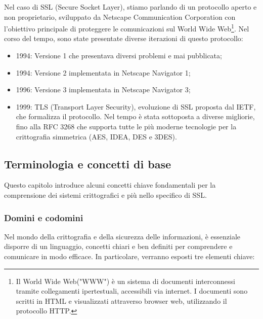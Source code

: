 \documentclass{article}
\theoremstyle{definition}
\begin{document}
Nel caso di SSL (Secure Socket Layer), stiamo parlando di un protocollo aperto e non proprietario, sviluppato da Netscape Communication Corporation con l'obiettivo principale di proteggere le comunicazioni sul World Wide Web\footnote{Il World Wide Web("WWW") è un sistema di documenti interconnessi tramite collegamenti ipertestuali, accessibili via internet. I documenti sono scritti in HTML e visualizzati attraverso browser web, utilizzando il protocollo HTTP.}. Nel corso del tempo, sono state presentate diverse iterazioni di questo protocollo:

\begin{itemize}[label={\textbullet}]
  \item 1994: Versione 1 che presentava diversi problemi e mai pubblicata;
  \item 1994: Versione 2 implementata in Netscape Navigator 1;
  \item 1996: Versione 3 implementata in Netscape Navigator 3;
  \item 1999: TLS (Transport Layer Security), evoluzione di SSL proposta dal IETF, che formalizza il protocollo. Nel tempo è stata sottoposta a diverse migliorie, fino alla RFC 3268 che supporta tutte le più moderne tecnologie per la crittografia simmetrica (AES, IDEA, DES e 3DES).
\end{itemize}

\subsection{Terminologia e concetti di base} %
Questo capitolo introduce alcuni concetti chiave fondamentali per la comprensione dei sistemi crittografici e più nello specifico di SSL.
\subsubsection{Domini e codomini}
Nel mondo della crittografia e della sicurezza delle informazioni, è essenziale disporre di un linguaggio, concetti chiari e ben definiti per comprendere e comunicare in modo efficace. In particolare, verranno esposti tre elementi chiave:
\end{document}

